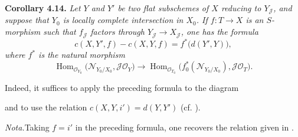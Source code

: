 \medskip
\noindent{}\textbf{Corollary 4.14.}
\textit{Let \(Y\) and \(Y'\) be two flat subschemes of \(X\) reducing to
\(Y_{\mathscr J}\), and suppose that \(Y_0\) is locally complete
intersection in \(X_0\). If \(f:T\to X\) is an \(S\)-morphism such that
\(f_{\mathscr J}\) factors through \(Y_{\mathscr J}\to X_{\mathscr J}\),
one has the formula}
\[
 c(X,Y',f)-c(X,Y,f)=f^*\bigl(d(Y',Y)\bigr),
\]
\textit{where \(f^*\) is the natural morphism}
\[
 \operatorname{Hom}_{\mathscr O_{Y_0}}
 \bigl(\mathscr N_{Y_0/X_0},\mathscr J\mathscr O_Y\bigr)
 \longrightarrow
 \operatorname{Hom}_{\mathscr O_{T_0}}
 \bigl(f_0^*(\mathscr N_{Y_0/X_0}),\mathscr J\mathscr O_T\bigr).
\]

Indeed, it suffices to apply the preceding formula to the diagram

\begin{center}
\end{center}

and to use the relation \(c(X,Y,i')=d(Y,Y')\) (cf.
).

\noindent\textit{Nota.}\quad Taking \(f=i'\) in the preceding formula, one
recovers the relation given in .

